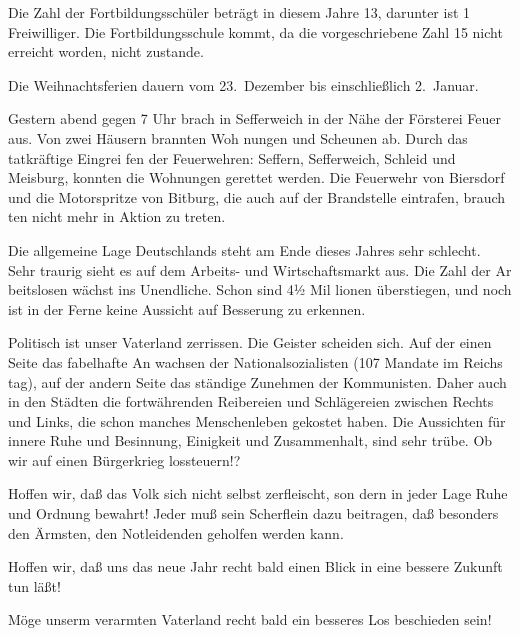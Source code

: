 

%
Die Zahl der Fortbildungsschüler beträgt in diesem\ob
Jahre 13, darunter ist 1 Freiwilliger. Die Fortbildungsschule\ob
kommt, da die vorgeschriebene Zahl 15 nicht erreicht worden,\ob
nicht zustande.

%
Die Weihnachtsferien dauern vom 23.\ Dezember\ob
bis einschließlich 2.\ Januar.

Gestern abend gegen 7 Uhr brach in Sefferweich in der Nähe der\ob
Försterei Feuer aus. Von zwei Häusern brannten Woh\ohb
nungen und Scheunen ab. Durch das tatkräftige Eingrei\ohb
fen der Feuerwehren: Seffern, Sefferweich, Schleid und\ob
Meisburg, konnten die Wohnungen gerettet werden.\ob
Die Feuerwehr von Biersdorf und die Motorspritze von\ob
Bitburg, die auch auf der Brandstelle eintrafen, brauch\ohb
ten nicht mehr in Aktion zu treten.

Die allgemeine Lage Deutschlands steht am Ende\ob
dieses Jahres sehr schlecht. Sehr traurig sieht es auf dem\ob
Arbeits- und Wirtschaftsmarkt aus. Die Zahl der Ar\ohb
beitslosen wächst ins Unendliche. Schon sind 4½ Mil\ohb
lionen überstiegen, und noch ist in der Ferne keine\ob
Aussicht auf Besserung zu erkennen.

Politisch ist unser Vaterland zerrissen. Die Geister\ob
scheiden sich. Auf der einen Seite das fabelhafte An\ohb
wachsen der Nationalsozialisten (107 Mandate im Reichs\ohb
tag), auf der andern Seite das ständige Zunehmen\ob
der Kommunisten. Daher auch in den Städten die\ob
fortwährenden Reibereien und Schlägereien zwischen\ob
Rechts und Links, die schon manches Menschenleben\ob
gekostet haben. Die Aussichten für innere Ruhe und\ob
Besinnung, Einigkeit und Zusammenhalt, sind sehr\ob
trübe. Ob wir auf einen Bürgerkrieg lossteuern!?

Hoffen wir, daß das Volk sich nicht selbst zerfleischt, son\ohb
dern in jeder Lage Ruhe und Ordnung bewahrt!\ob
Jeder muß sein Scherflein dazu beitragen, daß besonders\ob
den Ärmsten, den Notleidenden geholfen werden kann.

Hoffen wir, daß uns das neue Jahr recht bald\ob
einen Blick in eine bessere Zukunft tun läßt!

Möge unserm verarmten Vaterland recht bald\ob
ein besseres Los beschieden sein!
\pend
